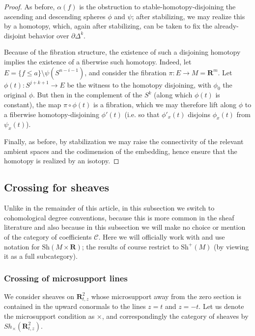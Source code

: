 \documentclass[12pt,a4paper]{article}
\numberwithin{equation}{section}
\theoremstyle{definition}
\theoremstyle{remark}
\newcommand{\R}{\mathbf{R}}
\newcommand{\del}{\partial}
\newcommand{\Sh}{\mathrm{Sh}}
\begin{document}
\begin{proof}
    As before, $\alpha(f)$ is the obstruction to stable-homotopy-disjoining the ascending and descending spheres $\phi$ and $\psi$; after stabilizing, we may realize this by a homotopy, which, again after stabilizing, can be taken to fix
    the already-disjoint behavior over $\del \Delta^k$.

    Because of the fibration structure, the existence of such a disjoining homotopy implies the existence of a fiberwise such homotopy. Indeed, let $E = \{f \le a\} \setminus \psi(S^{n-i-1})$, and consider the fibration $\pi: E \to M = \R^m$.  Let $\phi(t): S^{j+k+1} \to E$ be the witness to the homotopy disjoining, with $\phi_0$ the original $\phi$.  But then in the complement of the $S^k$ (along which $\phi(t)$ is constant), the map $\pi \circ \phi(t)$ is a fibration, which we may therefore lift along $\phi$ to a fiberwise homotopy-disjoining $\phi'(t)$ (i.e. so that $\phi'_x(t)$ disjoins $\phi_x(t)$ from $\psi_x(t)$).

    Finally, as before, by stabilization we may raise the connectivity of the relevant ambient spaces and the codimension of the embedding, hence ensure that the  homotopy is realized by an isotopy.
\end{proof}


\subsection{Crossing for sheaves}\label{subsec:crossingsheaves}

Unlike in the remainder of this article, in this subsection we switch to cohomological degree conventions, because this is more common in the sheaf literature and also because in this subsection we will make no choice or mention of the category of coefficients $\mathcal{C}$.  Here we will officially work with and use notation for $\Sh(M \times \R)$; the results of course restrict to $\Sh^+(M)$ (by viewing it as a full subcategory).



\subsubsection{Crossing of microsupport lines}

We consider sheaves on $\R^2_{t, z}$ whose microsupport away from the zero section is contained in the upward conormals to the lines $z=t$ and $z = -t$.
Let us denote the microsupport condition as $ \times$, and correspondingly the category of sheaves by $Sh_{\times}({\R^2_{t, z}})$.
\end{document}
